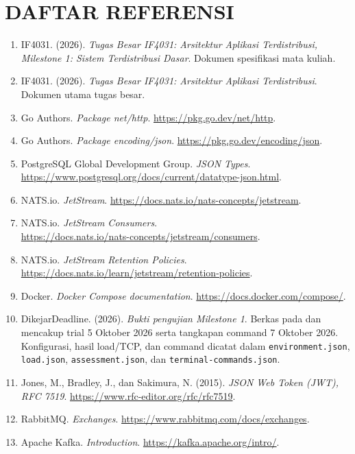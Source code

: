 \chapter*{DAFTAR REFERENSI}
\begin{enumerate}
  \item IF4031. (2026). \textit{Tugas Besar IF4031: Arsitektur Aplikasi Terdistribusi, Milestone 1: Sistem Terdistribusi Dasar}. Dokumen spesifikasi mata kuliah.
  \item IF4031. (2026). \textit{Tugas Besar IF4031: Arsitektur Aplikasi Terdistribusi}. Dokumen utama tugas besar.
  \item Go Authors. \textit{Package net/http}. \url{https://pkg.go.dev/net/http}.
  \item Go Authors. \textit{Package encoding/json}. \url{https://pkg.go.dev/encoding/json}.
  \item PostgreSQL Global Development Group. \textit{JSON Types}. \url{https://www.postgresql.org/docs/current/datatype-json.html}.
  \item NATS.io. \textit{JetStream}. \url{https://docs.nats.io/nats-concepts/jetstream}.
  \item NATS.io. \textit{JetStream Consumers}.\\
  \url{https://docs.nats.io/nats-concepts/jetstream/consumers}.
  \item NATS.io. \textit{JetStream Retention Policies}.\\
  \url{https://docs.nats.io/learn/jetstream/retention-policies}.
  \item Docker. \textit{Docker Compose documentation}. \url{https://docs.docker.com/compose/}.
  \item DikejarDeadline. (2026). \textit{Bukti pengujian Milestone 1}. Berkas pada  dan  mencakup trial 5 Oktober 2026 serta tangkapan command 7 Oktober 2026. Konfigurasi, hasil load/TCP, dan command dicatat dalam \texttt{environment.json}, \texttt{load.json}, \texttt{assessment.json}, dan \texttt{terminal-commands.json}.
  \item Jones, M., Bradley, J., dan Sakimura, N. (2015). \textit{JSON Web Token (JWT), RFC 7519}. \url{https://www.rfc-editor.org/rfc/rfc7519}.
  \item RabbitMQ. \textit{Exchanges}. \url{https://www.rabbitmq.com/docs/exchanges}.
  \item Apache Kafka. \textit{Introduction}. \url{https://kafka.apache.org/intro/}.
\end{enumerate}
